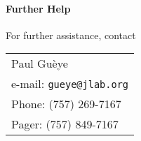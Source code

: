 {\paragraph{Further Help}

For further assistance, contact
\par
\noindent
\begin{table}[!ht]
\begin{tabular}{l}
Paul Gu\`eye \\
e-mail: {\tt gueye@jlab.org} \\
Phone: (757) 269-7167 \\
Pager: (757) 849-7167 \\
\end{tabular}
\end{table}



}
